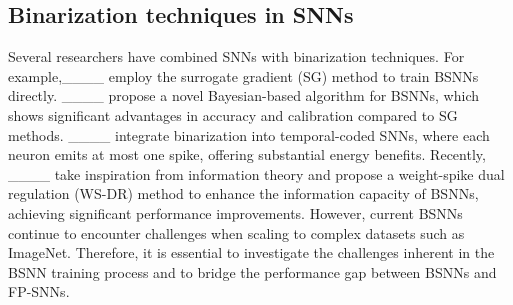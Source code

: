 \subsection{Binarization techniques in SNNs}


Several researchers have combined SNNs with binarization techniques.
For example,____ employ the surrogate gradient (SG) method to train BSNNs directly. 
____ propose a novel Bayesian-based algorithm for BSNNs, which shows significant advantages in accuracy and calibration compared to SG methods. 
____ integrate binarization into temporal-coded SNNs, where each neuron emits at most one spike, offering substantial energy benefits. 
Recently, ____ take inspiration from information theory and propose a weight-spike dual regulation (WS-DR) method to enhance the information capacity of BSNNs, achieving significant performance improvements. 
However, current BSNNs continue to encounter challenges when scaling to complex datasets such as ImageNet.
Therefore, it is essential to investigate the challenges inherent in the BSNN training process and to bridge the performance gap between BSNNs and FP-SNNs.